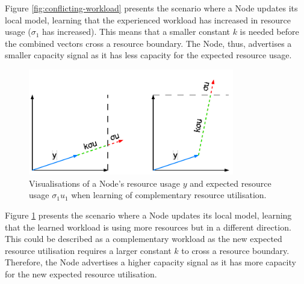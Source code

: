 Figure \ref{fig:conflicting-workload} presents the scenario where a Node updates
its local model, learning that the experienced workload has increased in
resource usage ($\sigma_1$ has increased). This means that a smaller constant
$k$ is needed before the combined vectors cross a resource boundary. The Node,
thus, advertises a smaller capacity signal as it has less capacity for
the expected resource usage.

\begin{figure}[ht!]
    \centering
    \includegraphics[width=0.8\textwidth]{images/complementary-workload.pdf}
    \caption{Visualisations of a Node's resource usage $y$ and expected resource
    usage $\sigma_1 u_1$ when learning of complementary resource utilisation.}
    \label{fig:complementary-workload}
\end{figure}

Figure \ref{fig:complementary-workload} presents the scenario where a Node updates
its local model, learning that the learned workload is using more resources but
in a different direction. This could be described as a complementary workload as
the new expected resource utilisation requires a larger constant $k$ to
cross a resource boundary. Therefore, the Node advertises a higher capacity
signal as it has more capacity for the new expected resource utilisation.

